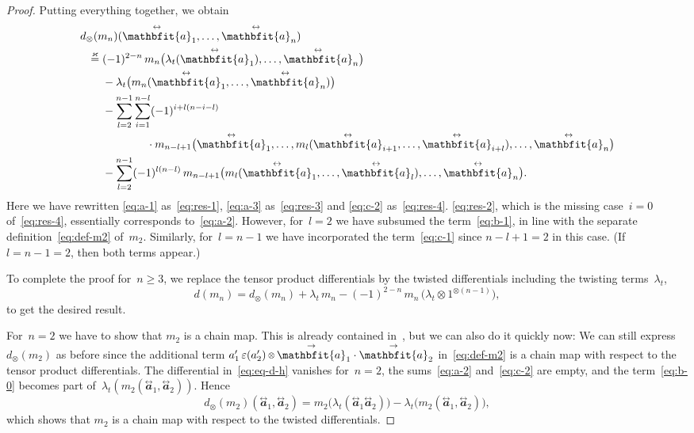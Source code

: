 \documentclass[letterpaper]{amsart}
\numberwithin{equation}{section}
\theoremstyle{plain}
\theoremstyle{definition}
\theoremstyle{remark}
\let\epsilon\varepsilon
\def\smallotimes{\mathbin{\mkern-1mu\vcenter{\hbox{$\scriptstyle\otimes$}}\mkern-1mu}}
\def\aa{\mathbfit{a}}
\def\raa{\overset{\text{$\rightarrow$}}{\aa}}
\def\taa{\overset{\text{$\leftrightarrow$}}{\aa}}
\def\ldd{\lambda_{t}}
\let\KS\varkappa
\def\eqKS{\stackrel{\KS}{=}}
\begin{document}
\begin{proof}
  Putting everything together, we obtain
  \begin{subequations}
  \begin{align}
    \notag \MoveEqLeft{d_{\otimes}(m_{n})(\taa_{1},\dots,\taa_{n})} \\
    \label{eq:res-1} \eqKS {} & (-1)^{2-n}\,m_{n}\bigl(\ldd(\taa_{1}),\dots,\taa_{n}\bigr) \\
    \label{eq:res-3} &- \ldd\bigl(m_{n}(\taa_{1},\dots,\taa_{n})\bigr) \\
    \label{eq:res-4} &- \sum_{l=2}^{n-1}\sum_{i=1}^{n-l} (-1)^{i+l(n-i-l)} \\*
    \notag &\qquad\qquad \cdot m_{n-l+1}\bigl(\taa_{1},\dots,m_{l}(\taa_{i+1},\dots,\taa_{i+l}),\dots,\taa_{n}\bigr) \\
    \label{eq:res-2} &- \sum_{l=2}^{n-1} (-1)^{l(n-l)}\,m_{n-l+1}\bigl(m_{l}(\taa_{1},\dots,\taa_{l}),\dots,\taa_{n}\bigr).
  \end{align}
  \end{subequations}
  Here we have rewritten \eqref{eq:a-1} as~\eqref{eq:res-1},
  \eqref{eq:a-3} as~\eqref{eq:res-3} and \eqref{eq:c-2} as~\eqref{eq:res-4}.
  \eqref{eq:res-2}, which is the missing case~$i=0$ of~\eqref{eq:res-4}, essentially corresponds to~\eqref{eq:a-2}. However,
  for~$l=2$ we have subsumed the term~\eqref{eq:b-1}, in line with the separate definition~\eqref{eq:def-m2} of~$m_{2}$.
  Similarly, for~$l=n-1$ we have incorporated the term~\eqref{eq:c-1} since $n-l+1=2$ in this case.
  (If $l=n-1=2$, then both terms appear.)
  
  To complete the proof for~$n\ge3$,
  we replace the tensor product differentials by the twisted differentials including the twisting terms~$\ldd$,
  \begin{equation}
    d(m_{n}) = d_{\otimes}(m_{n}) +\ldd\,m_{n} - (-1)^{2-n}\,m_{n}\,\bigl(\ldd\otimes 1^{\otimes(n-1)}\bigr),
  \end{equation}
  to get the desired result.

  For~$n=2$ we have to show that $m_{2}$ is a chain map. This is already contained in~\cite{CarlsonFranz},
  but we can also do it quickly now:
  We can still express $d_{\otimes}(m_{2})$ as before %
  since the additional term $a'_{1}\,\epsilon(a'_{2})\smallotimes \raa_{1}\cdot\raa_{2}$ in~\eqref{eq:def-m2} is a chain map
  with respect to the tensor product differentials.
  The differential in~\eqref{eq:eq-d-h} vanishes for~$n=2$,
  the sums~\eqref{eq:a-2} and~\eqref{eq:c-2} are empty,
  and the term~\eqref{eq:b-0} becomes part of~$\ldd(m_{2}(\taa_{1},\taa_{2}))$. Hence
  \begin{equation}
    d_{\otimes}(m_{2})(\taa_{1},\taa_{2}) = m_{2}\bigl(\ldd(\taa_{1}\taa_{2})\bigr) - \ldd\bigl(m_{2}(\taa_{1},\taa_{2})\bigr),
  \end{equation}
  which shows that $m_{2}$ is a chain map with respect to the twisted differentials.


\end{proof}
\end{document}
